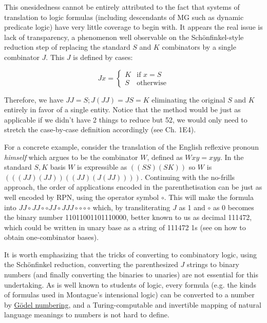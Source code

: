 \documentclass[output=paper,colorlinks=true,citecolor=brown]{langscibook}
\begin{document}
This onesidedness cannot be entirely attributed to the fact that systems of
translation to logic formulas (including descendants of MG such as dynamic
predicate logic) have very little coverage to begin with. It appears the real
issue is lack of transparency, a phenomenon well observable on the
Schönfinkel-style reduction step of replacing the standard $S$ and $K$ 
combinators by a single combinator $J$. This  $J$ is defined by cases:

\[
  Jx =
  \begin{cases}
    K & \text{if } x=S\\
    S & \text{otherwise}
  \end{cases}
\]

\noindent
Therefore, we have $JJ = S; J(JJ)= JS = K$ eliminating the original $S$ and $K$
entirely in favor of a single entity. Notice that the method would be just as
applicable if we didn't have 2 things to reduce but 52, we would only need to
stretch the case-by-case definition accordingly (see \cite{Curry:1958}
Ch. 1E4). 

For a concrete example, consider the translation of the English reflexive
pronoun \emph{himself} which \cite{Szabolcsi:1987} argues to be the combinator
$W$, defined as $W x y = x y y$. In the standard $S,K$ basis $W$ is
expressible as $((SS)(SK))$ so $W$ is $(((JJ)(JJ))((JJ)(J(JJ))))$. Continuing
with the no-frills approach, the order of applications encoded in the
parenthetisation can be just as well encoded by RPN, using the operator symbol
$\circ$. This will make the formula into $JJ\circ JJ\circ \circ
JJ\circ J JJ\circ \circ \circ \circ$ which, by transliterating $J$ as 1 and
$\circ$ as 0 becomes the binary number 11011001101110000, better known to us
as decimal 111472, which could be written in unary base as a string of 111472
1s (see \cite{Fokker:1989} on how to obtain one-combinator bases). 

It is worth emphasizing that the tricks of converting to combinatory logic,
using the Schönfinkel reduction, converting the parenthesized $J$ strings to
binary numbers (and finally converting the binaries to unaries) are not
essential for this undertaking. As is well known to students of logic, every
formula (e.g. the kinds of formulas used in Montague's intensional logic) can
be converted to a number by
\href{https://en.wikipedia.org/wiki/Gödel_numbering}{Gödel numbering}, and a
Turing-computable and invertible mapping of natural language meanings to
numbers is not hard to define.
\end{document}
